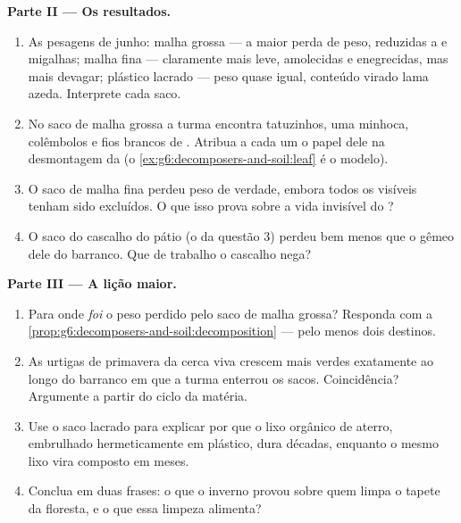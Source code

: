 \begin{problem}
\medskip\noindent\textbf{Parte II --- Os resultados.}
\begin{enumerate}[resume]
  \item As pesagens de junho: malha grossa --- a maior perda de peso,
         reduzidas a  e migalhas; malha fina ---
        claramente mais leve,  amolecidas e enegrecidas, mas
        mais devagar; plástico lacrado --- peso quase igual, conteúdo
        virado lama azeda. Interprete cada saco.
  \item No saco de malha grossa a turma encontra tatuzinhos, uma
        minhoca, colêmbolos e fios brancos de . Atribua a cada um
        o papel dele na desmontagem da  (o
        \cref{ex:g6:decomposers-and-soil:leaf} é o modelo).
  \item O saco de malha fina perdeu peso de verdade, embora todos os
         visíveis tenham sido excluídos. O que isso prova
        sobre a vida invisível do ?
  \item O saco do cascalho do pátio (o da questão 3) perdeu bem menos
        que o gêmeo dele do barranco. Que  de trabalho o
        cascalho nega?
\end{enumerate}

\medskip\noindent\textbf{Parte III --- A lição maior.}
\begin{enumerate}[resume]
  \item Para onde \emph{foi} o peso perdido pelo saco de malha
        grossa? Responda com a
        \cref{prop:g6:decomposers-and-soil:decomposition} --- pelo
        menos dois destinos.
  \item As urtigas de primavera da cerca viva crescem mais verdes
        exatamente ao longo do barranco em que a turma enterrou os
        sacos. Coincidência? Argumente a partir do ciclo da matéria.
  \item Use o saco lacrado para explicar por que o lixo orgânico de
        aterro, embrulhado hermeticamente em plástico, dura décadas,
        enquanto o mesmo lixo vira composto em meses.
  \item Conclua em duas frases: o que o inverno provou sobre quem
        limpa o tapete da floresta, e o que essa limpeza alimenta?
\end{enumerate}
\end{problem}
